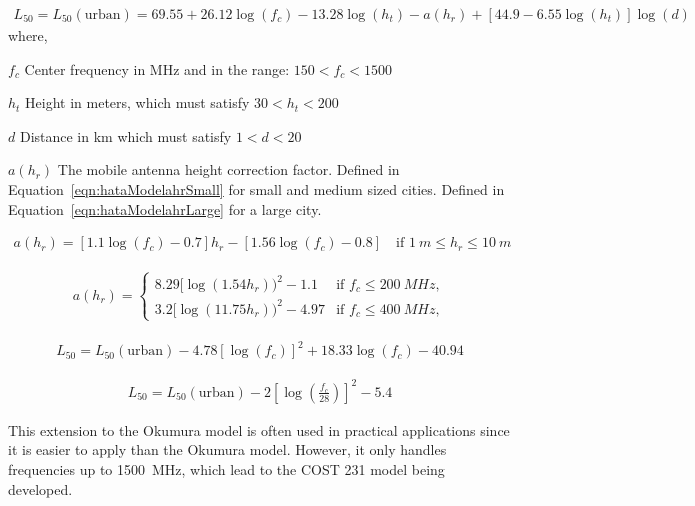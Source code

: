 \begin{align} 
\label{eqn:hataModelUrban}
L_{50} = L_{50}(\text{urban}) = 69.55+26.12 \log(f_c) - 13.28 \log(h_t) -a(h_r) + [44.9-6.55 \log(h_t)] \log(d)
\end{align} 
where, 
\begin{where}
\item [$f_{c}$] Center frequency in \si{MHz} and in the range: $150 < f_c < 1500$
\item [$h_t$] Height in meters, which must satisfy $30 < h_t < 200$
\item [$d$] Distance in km which must satisfy $1 < d < 20$
\item [$a(h_r)$] The mobile antenna height correction factor. Defined in Equation~\ref{eqn:hataModelahrSmall}\cite{Seybold2005introduction} for small and medium sized cities. Defined in Equation~\ref{eqn:hataModelahrLarge}\cite{Seybold2005introduction} for a large city. 
\end{where}

\begin{align} 
\label{eqn:hataModelahrSmall}
a(h_r) = [1.1 \log(f_c)-0.7]h_r - [1.56 \log(f_c)-0.8]\quad\text{if } \SI{1}{m} \leq h_r \leq \SI{10}{m} 
\end{align} 

\begin{align} 
\label{eqn:hataModelahrLarge}
a(h_r) = 
  \begin{cases}
    8.29[\log(1.54 h_r))^2 -1.1 & \text{if } f_c \leq \SI{200}{MHz}, \\
    3.2[\log(11.75 h_r))^2 -4.97 & \text{if } f_c \leq \SI{400}{MHz} ,
  \end{cases}
\end{align} 


\begin{align} 
\label{eqn:hataModelSubUrban}
L_{50} = L_{50}(\text{urban})-4.78[\log(f_c)]^2 + 18.33 \log(f_c) - 40.94
\end{align} 

\begin{align} 
\label{eqn:hataModelOpen}
L_{50} = L_{50}(\text{urban})-2 \left[\log\left( \frac{f_c}{28} \right) \right]^2 -5.4
\end{align} 

This extension to the Okumura model is often used in practical applications since it is easier to apply than the Okumura model. However, it only handles frequencies up to \SI{1500}{MHz}, which lead to the COST 231 model being developed. 

